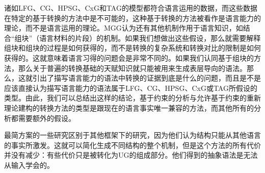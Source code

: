 诸如LFG、CG、HPSG、CxG和TAG的模型都符合语言运用的数据，而这些数据在特定的基于转换的方法中是不可能的，这种基于转换的方法被看作是语言能力的理论，而不是语言运用的理论。MGG认为还有其他机制作用于语言知识，如结合“组块”（语言材料的片段）的机制。如果我们想做出这些假设，那么就需要解释组块和组块的过程是如何获得的，而不是转换的复杂系统和转换对比的限制是如何获得的。这就意味着语言习得的问题会是非常不同的。如果我们认同基于组块的方法，那么关于普遍的转换基础的天赋知识就只能被用来生成表层导向的语法。那么，这就引出了描写语言能力的语法中转换的证据到底是什么的问题，而且是不是应该直接认为描写语言能力的语法属于LFG、CG、HPSG、CxG或TAG所假设的类型。由此，我们可以总结出这样的结论，基于约束的分析与允许基于约束的重新理论建构的转换方法的类型是跟现在的语言事实唯一兼容的方法，而其他所有的分析都需要额外的假设。

最简方案的一些研究区别于其他框架下的研究，因为他们认为结构只能从其他语言的事实所激发。这就可以简化生成不同结构的整个机制，但是这个方法的所有代价并没有减少：有些代价只是被转化为UG的组成部分。他们得到的抽象语法是无法从输入学会的。

